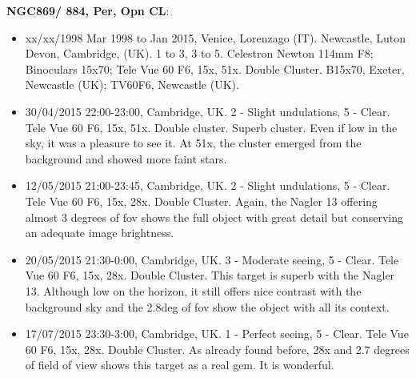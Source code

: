 {\bf NGC869/ 884, Per, Opn CL}:
\begin{itemize}
\item xx/xx/1998 Mar 1998 to Jan 2015, Venice, Lorenzago (IT). Newcastle, Luton Devon, Cambridge, (UK). 1 to 3, 3 to 5. Celestron Newton 114mm F8; Binoculars 15x70; Tele Vue 60 F6, 15x, 51x. Double Cluster. B15x70, Exeter, Newcastle (UK); TV60F6, Newcastle (UK).
\item 30/04/2015 22:00-23:00, Cambridge, UK. 2 - Slight undulations, 5 - Clear. Tele Vue 60 F6, 15x, 51x. Double cluster. Superb cluster. Even if low in the sky, it was a pleasure to see it. At 51x, the cluster emerged from the background and showed more faint stars.
\item 12/05/2015 21:00-23:45, Cambridge, UK. 2 - Slight undulations, 5 - Clear. Tele Vue 60 F6, 15x, 28x. Double Cluster. Again, the Nagler 13 offering almost 3 degrees of fov shows the full object with great detail but conserving an adequate image brightness. 
\item 20/05/2015 21:30-0:00, Cambridge, UK. 3 - Moderate seeing, 5 - Clear. Tele Vue 60 F6, 15x, 28x. Double Cluster. This target is superb with the Nagler 13. Although low on the horizon, it still offers nice contrast with the background sky and the 2.8deg of fov show the object with all its context.
\item 17/07/2015 23:30-3:00, Cambridge, UK. 1 - Perfect seeing, 5 - Clear. Tele Vue 60 F6, 15x, 28x. Double Cluster. As already found before, 28x and 2.7 degrees of field of view shows this target as a real gem. It is wonderful.
\end{itemize}
